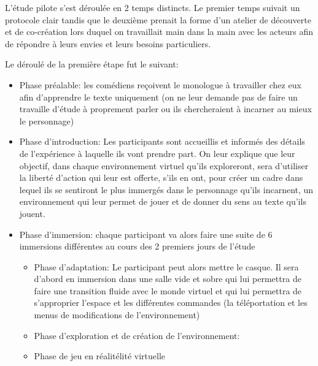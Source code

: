 L'étude pilote s'est déroulée en 2 temps distincts. Le premier temps suivait un protocole clair tandis que le deuxième prenait la forme d'un atelier de découverte et de co-création
lors duquel on travaillait main dans la main avec les acteurs afin de répondre à leurs envies et leurs besoins particuliers. 

Le déroulé de la première étape fut le suivant: 

\begin{itemize}
    \item Phase préalable: les comédiens reçoivent le monologue à travailler chez eux afin d'apprendre le texte uniquement (on ne leur demande pas de faire un travaille d'étude à proprement parler ou ils chercheraient à incarner au mieux le personnage)
    \item Phase d'introduction:  Les participants sont accueillis et informés des détails de l'expérience à laquelle ils vont prendre part. On leur explique que leur objectif, dans chaque environnement virtuel qu’ils exploreront, sera d’utiliser la liberté d’action qui leur est offerte, s’ils en ont, pour créer un cadre dans lequel ils se sentiront le plus immergés dans le personnage qu’ils incarnent, un environnement qui leur permet de jouer et de donner du sens au texte qu'ils jouent. 
    \item Phase d'immersion: chaque participant va alors faire une suite de 6 immersions différentes au cours des 2 premiers jours de l'étude
    \begin{itemize}
    \item Phase d'adaptation: Le participant peut alors mettre le casque. Il sera d'abord en immersion dans une salle vide et sobre qui lui permettra de faire une transition fluide avec le monde virtuel et qui lui permettra de s'approprier l'espace et les différentes commandes (la téléportation et les menus de modifications de l'environnement)
    \item Phase d'exploration et de création de l'environnement: 
    \item Phase de jeu en réalitélité virtuelle
    \end{itemize}

\end{itemize}



